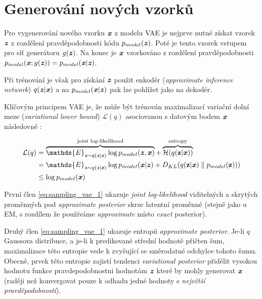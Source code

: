 \section{Generování nových vzorků}
\label{sec:vae_generating_new_data}
Pro vygenerování nového vzorku $\textbf{\emph{x}}$ z modelu VAE je nejprve nutné získat vzorek $\textbf{\emph{z}}$ z rozdělení pravděpodobnosti kódu $p_{model}(\textbf{\emph{z}})$.
Poté je tento vzorek vstupem pro síť generátoru $g(\textbf{\emph{z}})$. Na konec je $\textbf{\emph{x}}$ vzorkováno z rozdělení pravděpodobnosti $p_{model}(\textbf{\emph{x}};g(\textbf{\emph{z}})) = p_{model}(\textbf{\emph{x}}\mid\textbf{\emph{z}})$. \cite{Kingma2014}

Při trénování je však pro získání $\textbf{\emph{z}}$ použit enkodér (\emph{approximate inference network}) $q(\textbf{\emph{z}}\mid\textbf{\emph{x}})$ a na $p_{model}(\textbf{\emph{x}}\mid\textbf{\emph{z}})$ pak lze pohlížet jako na dekodér. \cite{Kingma2014}

Klíčovým principem VAE je, že může být trénován maximalizací variační dolní meze (\emph{variational lower bound}) $\mathcal{L}(q)$ asociovanou s datovým bodem $\textbf{\emph{x}}$ následovně \cite{Goodfellow2016}: 

\begin{align}
    \mathcal{L}(q) &= \overbrace{ \mathds{E}_{\textbf{\emph{z}} \sim q(\textbf{\emph{z}}\mid\textbf{\emph{x}})} \log p_{model}(\textbf{\emph{z}}, \textbf{\emph{x}}) }^\text{joint log-likelihood} + \overbrace{ \mathcal{H}(q(\textbf{z} \mid \textbf{\emph{x}})) }^\text{entropy} \label{eq:sampling_vae_1} \\
    &= \mathds{E}_{\textbf{\emph{z}} \sim q(\textbf{\emph{z}}\mid\textbf{\emph{x}})} \log p_{model}(\textbf{\emph{x}}\mid\textbf{\emph{z}}) + D_{KL}(q(\textbf{z} \mid \textbf{\emph{x}})\parallel p_{model}(\textbf{z}))) \label{eq:sampling_vae_2} \\
    &\leq \log p_{model}(\textbf{\emph{x}})
\end{align}

První člen \autoref{eq:sampling_vae_1} ukazuje \emph{joint log-likelihood} viditelných a skrytých proměnných pod \emph{approximate posterior} skrze latentní proměnné (stejně jako u EM, s rozdílem že používáme \emph{approximate} místo \emph{exact} posterior).

Druhý člen \autoref{eq:sampling_vae_1} ukazuje entropii \emph{approximate posterior}.
Je-li $q$ Gaussova distribuce, a je-li k predikované střední hodnotě přičten šum, maximalizace této entropie vede k zvyšující se směrodatné odchylce tohoto šumu.
Obecně, prvek této entropie zajistí tendenci \emph{variational posterior} přidělit vysokou hodnotu funkce pravdepodobnostni hodnotám $\textbf{\emph{z}}$ které by mohly generovat $\textbf{\emph{x}}$ (raději než konvergovat pouze k odhadu jedné hodnoty s \emph{největší pravděpodobností}).

